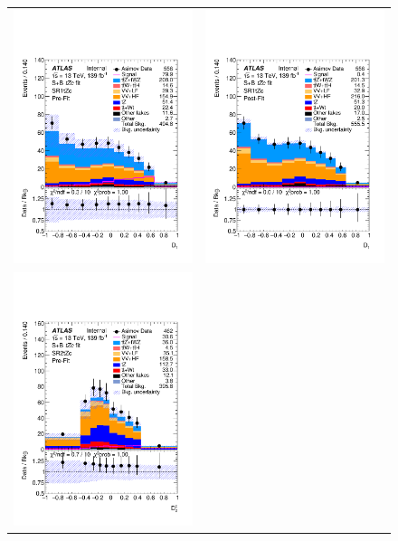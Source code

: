 \clearpage
\begin{figure}[htbp]
	\centering
	\begin{tabular}{cc}
		\includegraphics[width=.45\textwidth]{Appendices/AP9/figures/SPLUSB_CRSR_UsingBaseFullSys/Plots/SR1} &
		\includegraphics[width=.45\textwidth]{Appendices/AP9/figures/SPLUSB_CRSR_UsingBaseFullSys/Plots/SR1_postFit} \\
		\includegraphics[width=.45\textwidth]{Appendices/AP9/figures/SPLUSB_CRSR_UsingBaseFullSys/Plots/SR2} &

\end{tabular}
\end{figure}
